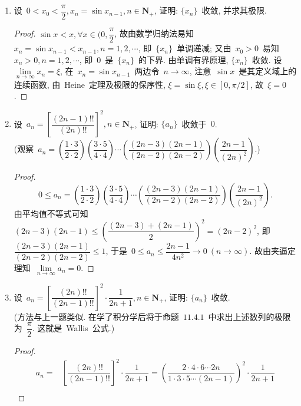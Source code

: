 \documentclass[UTF8,a4paper,11pt,twoside]{book}
\begin{document}
\begin{enumerate}
\begin{proof}
\begin{equation*}
\begin{split}
				      =                & \dfrac{1-2^{k(1-p)}}{1-2^{1-p}}\leqslant \dfrac{1}{1-2^{1-p}}
			      \end{split}
		      \end{equation*}
		      这表明~$\{S_n\}$~有界, 又显然~$\{S_n\}$~单调递增, 故由单调有界原理知~$\{S_n\}$~收敛.\qedhere
	      \end{proof}
	\item 设~$0<x_0<\dfrac{\pi}{2}, x_n=\sin{x_{n-1}}, n\in\mathbf{N}_{+}$, 证明: $\{x_n\}$~收敛, 并求其极限.
	      \begin{proof}
		      $\sin{x}<x, \forall x\in(0,\dfrac{\pi}{2}$, 故由数学归纳法易知~$x_n=\sin{x_{n-1}}<x_{n-1}, n=1, 2,\cdots$, 即~$\{x_n\}$~单调递减; 又由~$x_0>0$~易知~$x_n>0, n=1,2,\cdots$, 即~$0$~是~$\{x_n\}$~的下界. 由单调有界原理, $\{x_n\}$~收敛. 设~$\lim\limits_{n\to\infty} x_n=\xi$, 在~$x_n=\sin{x_{n-1}}$~两边令~$n\to\infty$, 注意~$\sin{x}$~是其定义域上的连续函数, 由~Heine~定理及极限的保序性, $\xi=\sin{\xi}, \xi\in[0,\pi/2]$, 故~$\xi=0$.\qedhere
	      \end{proof}
	\item 设~$a_n=\left[\dfrac{(2n-1)!!}{(2n)!!}\right]^2, n\in\mathbf{N}_{+}$, 证明: $\{a_n\}$~收敛于~$0$.\\
	      (观察~$a_n=\left(\dfrac{1\cdot3}{2\cdot2}\right)\left(\dfrac{3\cdot5}{4\cdot4}\right)\cdots\left(\dfrac{(2n-3)(2n-1)}{(2n-2)(2n-2)}\right)\left(\dfrac{2n-1}{(2n)^2}\right)$.)
	      \begin{proof}
		      \[
			      0\leqslant a_n=\left(\dfrac{1\cdot3}{2\cdot2}\right)\left(\dfrac{3\cdot5}{4\cdot4}\right)\cdots\left(\dfrac{(2n-3)(2n-1)}{(2n-2)(2n-2)}\right)\left(\dfrac{2n-1}{(2n)^2}\right).
		      \]
		      由平均值不等式可知~$(2n-3)(2n-1)\leqslant\left(\dfrac{(2n-3)+(2n-1)}{2}\right)^2=(2n-2)^2$, 即~$\dfrac{(2n-3)(2n-1)}{(2n-2)(2n-2)}\leqslant 1$, 于是~$0\leqslant a_n\leqslant\dfrac{2n-1}{4n^2}\to 0\ (n\to\infty)$. 故由夹逼定理知~$\lim\limits_{n\to\infty} a_n=0$.\qedhere
	      \end{proof}
	\item 设~$a_n=\left[\dfrac{(2n)!!}{(2n-1)!!}\right]^2\cdot\dfrac{1}{2n+1}, n\in\mathbf{N}_{+}$, 证明: $\{a_n\}$~收敛.\\
	      (方法与上一题类似. 在学了积分学后将于命题~$11.4.1$~中求出上述数列的极限为~$\dfrac{\pi}{2}$. 这就是~Wallis~公式.)
	      \begin{proof}
		      \begin{equation*}
			      \begin{split}
				      a_n=&\left[\dfrac{(2n)!!}{(2n-1)!!}\right]^2\cdot\dfrac{1}{2n+1}=\left(\dfrac{2\cdot4\cdot6\cdots2n}{1\cdot3\cdot5\cdots(2n-1)}\right)^2\cdot\dfrac{1}{2n+1}\\

\end{split}
\end{equation*}
\end{proof}
\end{enumerate}
\end{document}

